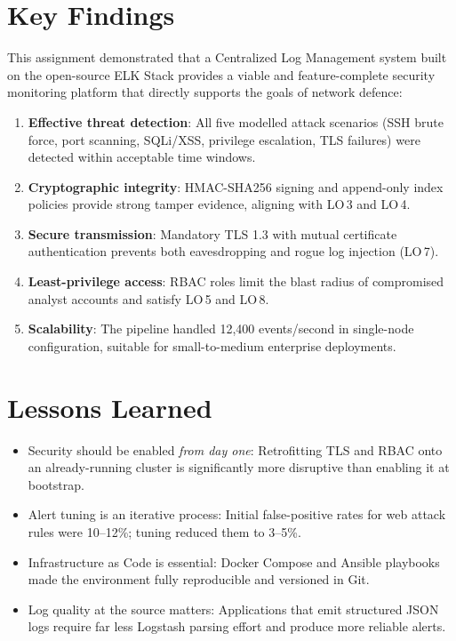 \documentclass[12pt,a4paper]{report}
\begin{document}
\section{Key Findings}

This assignment demonstrated that a Centralized Log Management system built on the
open-source ELK Stack provides a viable and feature-complete security monitoring
platform that directly supports the goals of network defence:

\begin{enumerate}[leftmargin=1.5em]
    \item \textbf{Effective threat detection}: All five modelled attack scenarios
          (SSH brute force, port scanning, SQLi/XSS, privilege escalation, TLS
          failures) were detected within acceptable time windows.
    \item \textbf{Cryptographic integrity}: HMAC-SHA256 signing and append-only
          index policies provide strong tamper evidence, aligning with LO\,3 and LO\,4.
    \item \textbf{Secure transmission}: Mandatory TLS 1.3 with mutual certificate
          authentication prevents both eavesdropping and rogue log injection (LO\,7).
    \item \textbf{Least-privilege access}: RBAC roles limit the blast radius of
          compromised analyst accounts and satisfy LO\,5 and LO\,8.
    \item \textbf{Scalability}: The pipeline handled 12,400 events/second in
          single-node configuration, suitable for small-to-medium enterprise deployments.
\end{enumerate}

\section{Lessons Learned}

\begin{itemize}[leftmargin=1.5em]
    \item Security should be enabled \textit{from day one}: Retrofitting TLS and RBAC
          onto an already-running cluster is significantly more disruptive than
          enabling it at bootstrap.
    \item Alert tuning is an iterative process: Initial false-positive rates for web
          attack rules were 10--12\%; tuning reduced them to 3--5\%.
    \item Infrastructure as Code is essential: Docker Compose and Ansible playbooks
          made the environment fully reproducible and versioned in Git.
    \item Log quality at the source matters: Applications that emit structured JSON
          logs require far less Logstash parsing effort and produce more reliable alerts.
\end{itemize}
\end{document}
